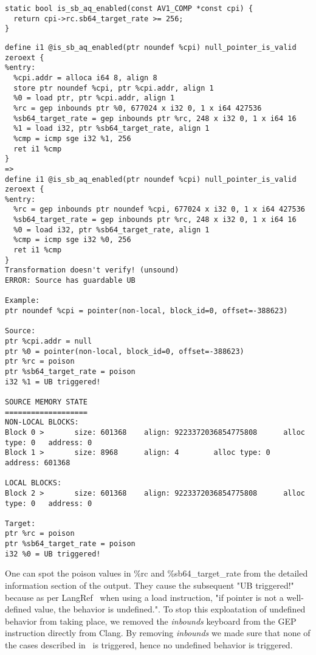 \begin{lstlisting}[style=Cstyle, caption={C code for is_sb_aq_enabled}, label={lst:is_sb_aq_enabled_c_code}]
static bool is_sb_aq_enabled(const AV1_COMP *const cpi) {
  return cpi->rc.sb64_target_rate >= 256;
}
\end{lstlisting}

\begin{lstlisting}[caption={Alive2 output on is_sb_aq_enabled}, label={lst:is_sb_aq_enabled_alive}]
define i1 @is_sb_aq_enabled(ptr noundef %cpi) null_pointer_is_valid zeroext {
%entry:
  %cpi.addr = alloca i64 8, align 8
  store ptr noundef %cpi, ptr %cpi.addr, align 1
  %0 = load ptr, ptr %cpi.addr, align 1
  %rc = gep inbounds ptr %0, 677024 x i32 0, 1 x i64 427536
  %sb64_target_rate = gep inbounds ptr %rc, 248 x i32 0, 1 x i64 16
  %1 = load i32, ptr %sb64_target_rate, align 1
  %cmp = icmp sge i32 %1, 256
  ret i1 %cmp
}
=>
define i1 @is_sb_aq_enabled(ptr noundef %cpi) null_pointer_is_valid zeroext {
%entry:
  %rc = gep inbounds ptr noundef %cpi, 677024 x i32 0, 1 x i64 427536
  %sb64_target_rate = gep inbounds ptr %rc, 248 x i32 0, 1 x i64 16
  %0 = load i32, ptr %sb64_target_rate, align 1
  %cmp = icmp sge i32 %0, 256
  ret i1 %cmp
}
Transformation doesn't verify! (unsound)
ERROR: Source has guardable UB

Example:
ptr noundef %cpi = pointer(non-local, block_id=0, offset=-388623)

Source:
ptr %cpi.addr = null
ptr %0 = pointer(non-local, block_id=0, offset=-388623)
ptr %rc = poison
ptr %sb64_target_rate = poison
i32 %1 = UB triggered!

SOURCE MEMORY STATE
===================
NON-LOCAL BLOCKS:
Block 0 >       size: 601368    align: 9223372036854775808      alloc type: 0   address: 0
Block 1 >       size: 8968      align: 4        alloc type: 0   address: 601368

LOCAL BLOCKS:
Block 2 >       size: 601368    align: 9223372036854775808      alloc type: 0   address: 0

Target:
ptr %rc = poison
ptr %sb64_target_rate = poison
i32 %0 = UB triggered!
\end{lstlisting}

One can spot the poison values in \%rc and \%sb64_target_rate from the detailed
information section of the output. They cause the subsequent "UB triggered!"
because as per
LangRef~\cite{load-semantics} when using a load instruction, "if pointer is not a
well-defined value, the behavior is undefined.". To stop this exploatation of
undefined behavior from taking place, we removed the \textit{inbounds} keyboard
from the GEP instruction directly from Clang. By removing \textit{inbounds} we
made sure that none of the cases described in~\cite{getelementptr-semantics} is
triggered, hence no undefined behavior is triggered.

